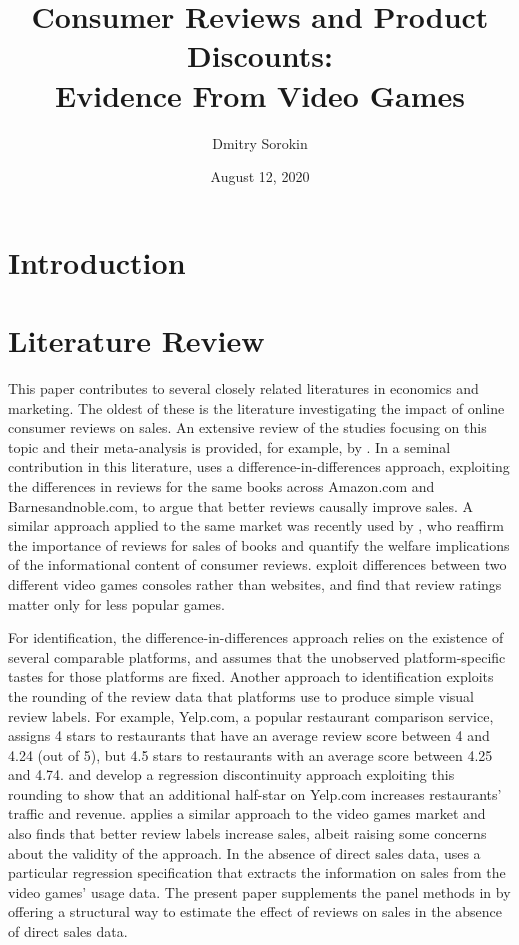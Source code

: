 \documentclass[12pt,pagebackref]{article}
\title{Consumer Reviews and Product Discounts:\\
Evidence From Video Games}
\author{Dmitry Sorokin}
\date{August 12, 2020}
\begin{document}
\maketitle

\hypertarget{introduction}{%
\section{Introduction}\label{introduction}}

\hypertarget{literature-review}{%
\section{Literature Review}\label{literature-review}}

This paper contributes to several closely related literatures in
economics and marketing. The oldest of these is the literature
investigating the impact of online consumer reviews on sales. An
extensive review of the studies focusing on this topic and their
meta-analysis is provided, for example, by \citet{Floyd14}. In a seminal
contribution in this literature, \citet{ChevalierMayzlin06} uses a
difference-in-differences approach, exploiting the differences in
reviews for the same books across Amazon.com and Barnesandnoble.com, to
argue that better reviews causally improve sales. A similar approach
applied to the same market was recently used by
\citet{ReimersWaldfogel20}, who reaffirm the importance of reviews for
sales of books and quantify the welfare implications of the
informational content of consumer reviews. \citet{ZhuZhang10} exploit
differences between two different video games consoles rather than
websites, and find that review ratings matter only for less popular
games.

For identification, the difference-in-differences approach relies on the
existence of several comparable platforms, and assumes that the
unobserved platform-specific tastes for those platforms are fixed.
Another approach to identification exploits the rounding of the review
data that platforms use to produce simple visual review labels. For
example, Yelp.com, a popular restaurant comparison service, assigns 4
stars to restaurants that have an average review score between 4 and
4.24 (out of 5), but 4.5 stars to restaurants with an average score
between 4.25 and 4.74. \citet{AndersonMagruder12} and \citet{Luca16}
develop a regression discontinuity approach exploiting this rounding to
show that an additional half-star on Yelp.com increases restaurants'
traffic and revenue. \citet{SorokinStevens20} applies a similar approach
to the video games market and also finds that better review labels
increase sales, albeit raising some concerns about the validity of the
approach. In the absence of direct sales data, \citet{SorokinStevens20}
uses a particular regression specification that extracts the information
on sales from the video games' usage data. The present paper supplements
the panel methods in \citet{SorokinStevens20} by offering a structural
way to estimate the effect of reviews on sales in the absence of direct
sales data.
\end{document}
